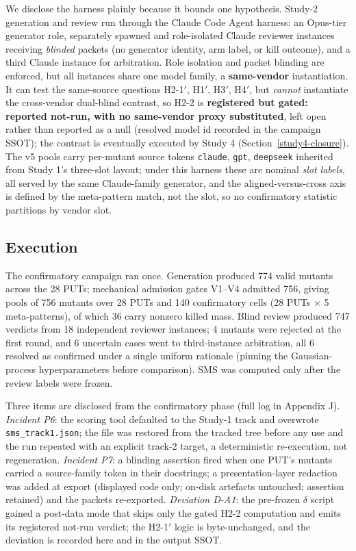 \documentclass[manuscript,screen,review]{acmart}
\begin{document}
We disclose the harness plainly because it bounds one hypothesis. Study-2
generation and review run through the Claude Code Agent harness: an Opus-tier
generator role, separately spawned and role-isolated Claude reviewer instances
receiving \emph{blinded} packets (no generator identity, arm label, or
kill outcome), and a third Claude instance for arbitration. Role isolation and
packet blinding are enforced, but all instances share one model family, a
\textbf{same-vendor} instantiation. It can test the same-source questions
H2-1\('\), H1\('\), H3\('\), H4\('\), but \emph{cannot} instantiate the
cross-vendor dual-blind contrast, so H2-2 is \textbf{registered but gated:
reported not-run, with no same-vendor proxy substituted}, left open rather than
reported as a null (resolved model id recorded in the campaign SSOT); the
contrast is eventually executed by Study 4 (Section~\ref{study4-closure}). The v5
pools carry per-mutant source tokens \texttt{claude}, \texttt{gpt},
\texttt{deepseek} inherited from Study 1's three-slot layout; under this harness
these are nominal \emph{slot labels}, all served by the same Claude-family
generator, and the aligned-versus-cross axis is defined by the meta-pattern
match, not the slot, so no confirmatory statistic partitions by vendor slot.

\subsection{Execution}\label{study2-execution}

The confirmatory campaign ran once. Generation produced 774 valid
mutants across the 28 PUTs; mechanical admission gates V1--V4 admitted
756, giving pools of 756 mutants over 28 PUTs and 140 confirmatory cells
(28 PUTs \(\times\) 5 meta-patterns), of which 36 carry nonzero killed
mass. Blind review produced 747 verdicts from 18 independent reviewer
instances; 4 mutants were rejected at the first round, and 6 uncertain
cases went to third-instance arbitration, all 6 resolved as confirmed
under a single uniform rationale (pinning the Gaussian-process
hyperparameters before comparison). SMS was computed only after the
review labels were frozen.

Three items are disclosed from the confirmatory phase (full log in Appendix J).
\emph{Incident P6}: the scoring tool defaulted to the Study-1 track and
overwrote \texttt{sms\_track1.json}; the file was restored from the tracked tree
before any use and the run repeated with an explicit track-2 target, a
deterministic re-execution, not regeneration. \emph{Incident P7}: a blinding
assertion fired when one PUT's mutants carried a source-family token in their
docstrings; a presentation-layer redaction was added at export (displayed code
only; on-disk artefacts untouched; assertion retained) and the packets
re-exported. \emph{Deviation D-A1}: the pre-frozen $\delta$ script gained a
post-data mode that skips only the gated H2-2 computation and emits its
registered not-run verdict; the H2-1\('\) logic is byte-unchanged, and the
deviation is recorded here and in the output SSOT.
\end{document}
